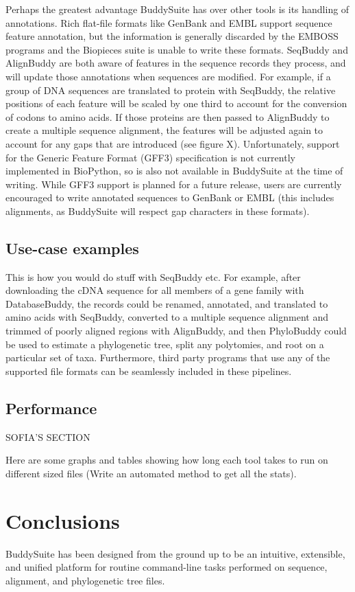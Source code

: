 \documentclass[twocolumn]{bmcart}%
\begin{document}
Perhaps the greatest advantage BuddySuite has over other tools is its handling of annotations. Rich flat-file formats like GenBank and EMBL support sequence feature annotation, but the information is generally discarded by the EMBOSS programs and the Biopieces suite is unable to write these formats. SeqBuddy and AlignBuddy are both aware of features in the sequence records they process, and will update those annotations when sequences are modified. For example, if a group of DNA sequences are translated to protein with SeqBuddy, the relative positions of each feature will be scaled by one third to account for the conversion of codons to amino acids. If those proteins are then passed to AlignBuddy to create a multiple sequence alignment, the features will be adjusted again to account for any gaps that are introduced (see figure X). Unfortunately, support for the Generic Feature Format (GFF3) specification is not currently implemented in BioPython, so is also not available in BuddySuite at the time of writing. While GFF3 support is planned for a future release, users are currently encouraged to write annotated sequences to GenBank or EMBL (this includes alignments, as BuddySuite will respect gap characters in these formats).

\subsection*{Use-case examples}

This is how you would do stuff with SeqBuddy etc.
For example, after downloading the cDNA sequence for all members of a gene family with DatabaseBuddy, the records could be renamed, annotated, and translated to amino acids with SeqBuddy, converted to a multiple sequence alignment and trimmed of poorly aligned regions with AlignBuddy, and then PhyloBuddy could be used to estimate a phylogenetic tree, split any polytomies, and root on a particular set of taxa. Furthermore, third party programs that use any of the supported file formats can be seamlessly included in these pipelines.

\subsection*{Performance}
SOFIA'S SECTION

Here are some graphs and tables showing how long each tool takes to run on different sized files (Write an automated method to get all the stats).

\section*{Conclusions}
BuddySuite has been designed from the ground up to be an intuitive, extensible, and unified platform for routine command-line tasks performed on sequence, alignment, and phylogenetic tree files. 
\end{document}
